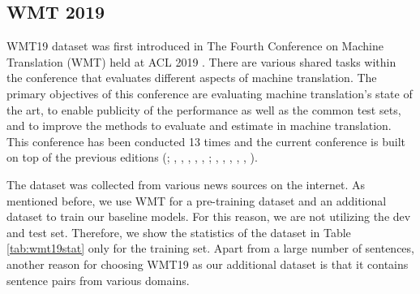 \subsection{WMT 2019}
WMT19 dataset was first introduced in The Fourth Conference on Machine Translation (WMT) held at ACL 2019 \cite{barrault-etal-2019-findings}. There are various shared tasks within the conference that evaluates different aspects of machine translation. The primary objectives of this conference are evaluating machine translation's state of the art, to enable publicity of the performance as well as the common test sets, and to improve the methods to evaluate and estimate in machine translation. This conference has been conducted 13 times and the current conference is built on top of the previous editions (\cite{koehn-monz-2006-manual}; \cite{callison-burch-etal-2007-meta}, \cite{callison-burch-etal-2008-meta}, \cite{callison-burch-etal-2009-findings}, \cite{callison-burch-etal-2010-findings}, \cite{callison-burch-etal-2011-findings}, \cite{callison-burch-etal-2012-findings}; \cite{bojar-etal-2013-findings}, \cite{bojar-etal-2014-findings}, \cite{bojar-etal-2015-findings}, \cite{bojar-etal-2016-findings}, \cite{bojar-etal-2017-findings}, \cite{bojar-etal-2018-findings}).

The dataset was collected from various news sources on the internet. As mentioned before, we use WMT for a pre-training dataset and an additional dataset to train our baseline models. For this reason, we are not utilizing the dev and test set. Therefore, we show the statistics of the dataset in Table \ref{tab:wmt19stat} only for the training set. Apart from a large number of sentences, another reason for choosing WMT19 as our additional dataset is that it contains sentence pairs from various domains.

